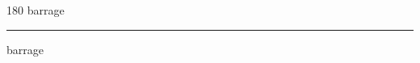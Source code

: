 
\begin{frame}
\begin{center}
\begin{turn}{180}
{\fontsize{2.5cm}{1em}\selectfont barrage}
\end{turn}
\vspace{1em}\par  
\hrule
\vspace{1em}\par  
{\fontsize{2.5cm}{1em}\selectfont barrage}
\end{center}
\end{frame}
